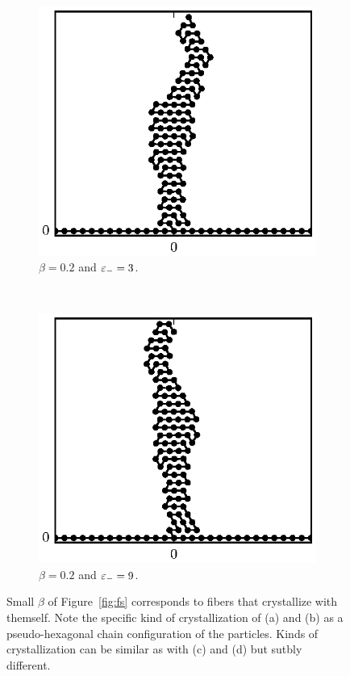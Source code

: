 {\begin{figure}[h!]
		\begin{subfigure}{.5\textwidth}
			\centering
			\includegraphics{./fig/ch3/fs/b0.2_eb3.eps}
			\caption{$\beta=0.2$ and $\varepsilon_-=3$.\label{subfig:crystal1}}
		\end{subfigure}%
		~
		\begin{subfigure}{.5\textwidth}
			\centering
			\includegraphics{./fig/ch3/fs/b0.2_eb9.eps}
			\caption{$\beta=0.2$ and $\varepsilon_-=9$.\label{subfig:crystal2}}
		\end{subfigure}	
		\caption{Small $\beta$ of Figure~\ref{fig:fs} corresponds to fibers that crystallize with themself. Note the specific kind of crystallization of (a) and (b) as a pseudo-hexagonal chain configuration of the particles. Kinds of crystallization can be similar as with (c) and (d) but sutbly different.\label{fig:crystal}}	
	\end{figure}

}
